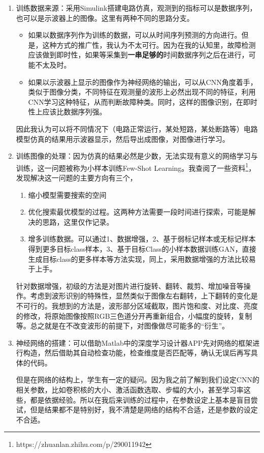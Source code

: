 \documentclass{article}
\begin{document}
	\begin{enumerate}
		\item 训练数据来源：采用Simulink搭建电路仿真，观测到的指标可以是数据序列，也可以是示波器上的图像。这里有两种不同的思路分支。
		\begin{itemize}
			\item 如果以数据序列作为训练的数据，可以从时间序列预测的方向进行。但是，这种方式的推广性，我认为不太可行。因为在我的认知里，故障检测应该做到即时性，如果等采集到\textbf{一串足够的}时间数据序列之后在进行，可能不太及时。
			\item 如果以示波器上显示的图像作为神经网络的输出，可以从CNN角度着手，类似于图像分类，不同特征在观测量的波形上必然出现不同的特征，利用CNN学习这种特征，从而判断故障种类。同时，这样的图像识别，在即时性上应该比数据序列强。
		\end{itemize}
	
		因此我认为可以将不同情况下（电路正常运行，某处短路，某处断路等）电路模型仿真的结果用示波器显示，然后导出成图像，对图像进行学习。
		
		\item 训练图像的处理：因为仿真的结果必然是少数，无法实现有意义的网络学习与训练，这一问题被称为小样本训练Few-Shot Learning。我查阅了一些资料\footnote{https://zhuanlan.zhihu.com/p/290011942}，发现解决这一问题的主要方向有三个，
		
		\begin{enumerate}
			\item 缩小模型需要搜索的空间
			\item 优化搜索最优模型的过程。这两种方法需要一段时间进行探索，可能是解决的思路，这里仅作记录。
			\item 增多训练数据。可以通过1、数据增强，2、基于弱标记样本或无标记样本得到更多目标class样本，3、基于目标Class的小样本数据训练GAN，直接生成目标class的更多样本等方法实现，同上，采用数据增强的方法比较易于上手。
		\end{enumerate}
	
		针对数据增强，初级的方法是对图片进行旋转、翻转、裁剪、增加噪音等操作。考虑到波形识别的特殊性，显然类似于图像左右翻转，上下翻转的变化是不可行的。我想到的方法是，波形部分区域截取，图片饱和度、对比度、亮度的修改，将原始图像按照RGB三色道分开再重新组合，小幅度的旋转，复制等。总之就是在不改变波形的前提下，对图像做尽可能多的“衍生”。
		
		\item 神经网络的搭建：可以借助Matlab中的深度学习设计器APP先对网络的框架进行构造，然后借助其自动检查功能，检查维度是否匹配等，确认无误后再写具体的代码。
		
		但是在网络的结构上，学生有一定的疑问。因为我之前了解到我们设定CNN的相关参数，比如卷积核的大小、激活函数选取、步幅的大小，甚至学习率这些，都是依据经验。所以在我后来训练的过程中，在参数设定上基本是盲目尝试，但是结果都不是特别好，我不清楚是网络的结构不合适，还是参数的设定不合适。
	\end{enumerate}
\end{document}
